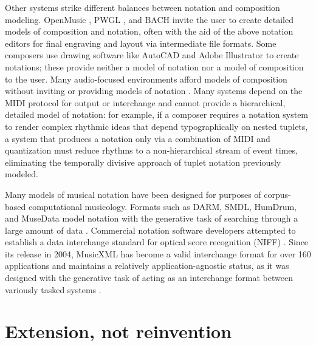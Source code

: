 \documentclass{article}
\begin{document}
Other systems strike different balances between notation and composition
modeling. OpenMusic \cite{Assayag:1999sw}, PWGL \cite{Laurson:2009qf}, and BACH
\cite{agostini2013real} invite the user to create detailed models of
composition and notation, often with the aid of the above notation editors for
final engraving and layout via intermediate file formats. Some composers use
drawing software like AutoCAD and Adobe Illustrator to create notations; these
provide neither a model of notation nor a model of composition to the user.
Many audio-focused environments afford models of composition without inviting
or providing models of notation \cite{Ariza2005b}. Many systems depend on the
MIDI protocol for output or interchange and cannot provide a hierarchical,
detailed model of notation: for example, if a composer requires a notation
system to render complex rhythmic ideas that depend typographically on nested
tuplets, a system that produces a notation only via a combination of MIDI and
quantization must reduce rhythms to a non-hierarchical stream of event times,
eliminating the temporally divisive approach of tuplet notation previously
modeled.

Many models of musical notation have been designed for purposes of
corpus-based computational musicology. Formats such as DARM, SMDL,
HumDrum, and MuseData model notation with the generative task of searching
through a large amount of data \cite{Selfridge-Field:1997ud}. Commercial
notation software developers attempted to establish a data interchange standard
for optical score recognition (NIFF) \cite{niff1995niff}. Since its release in
2004, MusicXML has become a valid interchange format for over 160 applications
and maintains a relatively application-agnostic status, as it was designed with
the generative task of acting as an interchange format between variously tasked
systems \cite{Good:2001if}.

\section{Extension, not reinvention} \label{sec:extension}
\end{document}
